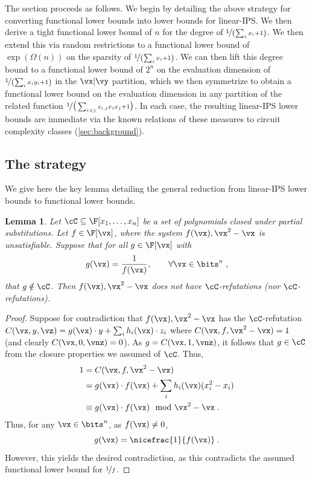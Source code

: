 \documentclass[11pt]{article}
\numberwithin{equation}{section}
\newtheorem{lemma}[theorem]{Lemma}
\theoremstyle{definition}
\theoremstyle{plain}
\begin{document}
The section proceeds as follows.  We begin by detailing the above strategy for converting functional lower bounds into lower bounds for linear-IPS\@. We then derive a tight functional lower bound of $n$ for the degree of $\nicefrac{1}{\left(\sum_i x_i+1\right)}$. We then extend this via random restrictions to a functional lower bound of $\exp(\Omega(n))$ on the sparsity of $\nicefrac{1}{\left(\sum_i x_i+1\right)}$.  We can then lift this degree bound to a functional lower bound of $2^n$ on the evaluation dimension of $\nicefrac{1}{\left(\sum_i x_iy_i+1\right)}$ in the $\vx|\vy$ partition, which we then symmetrize to obtain a functional lower bound on the evaluation dimension in any partition of the related function $\nicefrac{1}{\big(\sum_{i<j} z_{i,j}x_ix_j+1\big)}$.  In each case, the resulting linear-IPS lower bounds are immediate via the known relations of these measures to circuit complexity classes (\autoref{sec:background}).

\subsection{The strategy}\label{sec:lbs-fn:strategy}

We give here the key lemma detailing the general reduction from linear-IPS lower bounds to functional lower bounds.

\begin{lemma}\label{res:lbs-fn_lbs-ips:lIPS}
        Let $\cC\subseteq\F[x_1,\ldots,x_n]$ be a set of polynomials closed under partial substitutions. Let $f\in\F[\vx]$, where the system $f(\vx),\vx^2-\vx$ is unsatisfiable.  Suppose that for all $g\in\F[\vx]$ with
        \[
                g(\vx)=\frac{1}{f(\vx)},\qquad \forall \vx\in\bits^n\;,
        \]
        that $g\notin \cC$.  Then $f(\vx),\vx^2-\vx$ does not have $\cC$-\lIPS refutations (nor  $\cC$-\lbIPS refutations).
\end{lemma}
\begin{proof}
        Suppose for contradiction that $f(\vx),\vx^2-\vx$ has the $\cC$-\lIPS refutation $C(\vx,y,\vz)=g(\vx)\cdot y+\sum_i h_i(\vx) \cdot z_i$ where $C(\vx,f,\vx^2-\vx)=1$ (and clearly $C(\vx,0,\vnz)=0$). As $g=C(\vx,1,\vnz)$, it follows that $g\in\cC$ from the closure properties we assumed of $\cC$. Thus,
        \begin{align*}
                1&=C(\vx,f,\vx^2-\vx)\\
                &=g(\vx)\cdot f(\vx)+\sum_i h_i(\vx) (x_i^2-x_i)\\
                &\equiv g(\vx)\cdot f(\vx)\mod\vx^2-\vx
                \;.
        \end{align*}
        Thus, for any $\vx\in\bits^n$, as $f(\vx)\ne 0$,
        \[
                g(\vx)=\nicefrac{1}{f(\vx)}
                \;.
        \]
        However, this yields the desired contradiction, as this contradicts the assumed functional lower bound for $\nicefrac{1}{f}$.
\end{proof}
\end{document}
